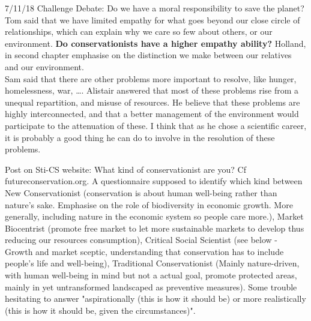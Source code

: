 \documentclass[12pt]{article}
\begin{document}
7/11/18 Challenge Debate: Do we have a moral responsibility to save the planet?
Tom said that we have limited empathy for what goes beyond our close circle of relationships, which can explain why we care so few about others, or our environment.
\textbf{Do conservationists have a higher empathy ability?}
Holland, in \cite{redpath2015conflicts} second chapter emphasise on the distinction we make between our relatives and our environment.\\
Sam said that there are other problems more important to resolve, like hunger, homelessness, war, \dots. Alistair answered that most of these problems rise from a unequal repartition, and misuse of resources. He believe that these problems are highly interconnected, and that a better management of the environment would participate to the attenuation of these. I think that as he chose a scientific career, it is probably a good thing he can do to involve in the resolution of these problems.

Post on Sti-CS website: What kind of conservationist are you?
Cf futureconservation.org.
A questionnaire supposed to identify which kind between New Conservationist (conservation is about human well-being rather than nature's sake. Emphasise on the role of biodiversity in economic growth. More generally, including nature in the economic system so people care more.), Market Biocentrist (promote free market to let more sustainable markets to develop thus reducing our resources consumption), Critical Social Scientist (see below - Growth and market sceptic, understanding that conservation has to include people's life and well-being), Traditional Conservationist (Mainly nature-driven, with human well-being in mind but not a actual goal, promote protected areas, mainly in yet untransformed landscaped as preventive measures). Some trouble hesitating to answer "aspirationally (this is how it should be) or more realistically (this is how it should be, given the circumstances)". 
\end{document}
